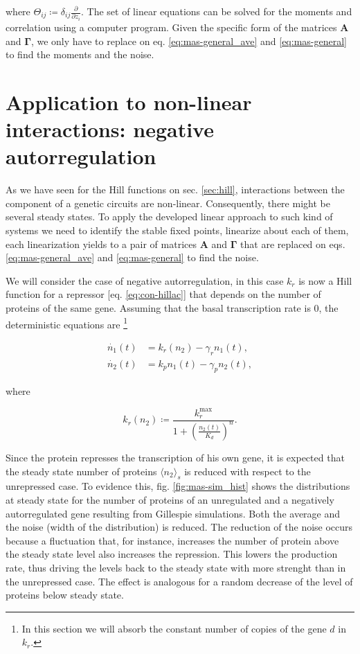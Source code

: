 where $\Theta_{ij} \coloneqq \delta_{ij}\frac{\partial}{\partial z_i}$. The set of linear equations can be solved for the moments and correlation using a computer program. Given the specific form of the matrices $\mathbf{A}$ and $\mathbf{\Gamma}$, we only have to replace on eq. \eqref{eq:mas-general_ave} and \eqref{eq:mas-general} to find the moments and the noise.

\section{Application to non-linear interactions: negative autorregulation}
\label{sec:mas-neg_autorreg}

As we have seen for the Hill functions on sec. \ref{sec:hill}, interactions between the component of a genetic circuits are non-linear. Consequently, there might be several steady states. To apply the developed linear approach to such kind of systems we need to identify the stable fixed points, linearize about each of them, each linearization yields to a pair of matrices $\mathbf{A}$ and $\mathbf{\Gamma}$  that are replaced on eqs. \eqref{eq:mas-general_ave} and \eqref{eq:mas-general} to find the noise.

We will consider the case of negative autorregulation, in this case $k_r$ is now a Hill function for a repressor [eq. \eqref{eq:con-hillac}] that depends on the number of proteins of the same gene. Assuming that the basal transcription rate is $0$, the deterministic equations are \footnote{In this section we will absorb the constant number of copies of the gene $d$ in $k_r$.}

\begin{equation}
  \label{eq:mas-autorr_det}
  \begin{split}
    \dot{n_1}(t) &= k_r(n_2) - \gamma_rn_1(t),\\
    \dot{n_2}(t) &= k_pn_1(t)-\gamma_pn_2(t),
  \end{split}
\end{equation}

where

\begin{equation*}
  k_r(n_2) \coloneqq \frac{k_r^{\text{max}}}{1+\left(\frac{n_2(t)}{K_d}\right)^n}.
\end{equation*}

Since the protein represses the transcription of his own gene, it is expected that the steady state number of proteins $\langle n_2\rangle_s$ is reduced with respect to the unrepressed case. To evidence this, fig. \ref{fig:mas-sim_hist} shows the distributions at steady state for the number of proteins of an unregulated and a negatively autorregulated gene resulting from Gillespie simulations. Both the average and the noise (width of the distribution) is reduced. The reduction of the noise occurs because a fluctuation that, for instance, increases the number of protein above the steady state level also increases the repression. This lowers the production rate, thus driving the levels back to the steady state with more strenght than in the unrepressed case. The effect is analogous for a random decrease of the level of proteins below steady state.

